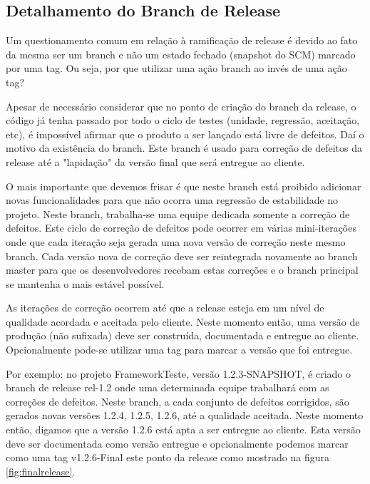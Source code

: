 \subsection{Detalhamento do Branch de Release}
\label{subsec:detalherelease}
Um questionamento comum em rela{\c c}{\~a}o à ramifica{\c c}{\~a}o de release {\'e} devido ao fato da mesma ser um branch e n{\~a}o um estado fechado (snapshot do SCM) marcado por uma tag. Ou seja, por que utilizar uma a{\c c}{\~a}o branch ao inv{\'e}s de uma a{\c c}{\~a}o tag?

Apesar de necess{\'a}rio considerar que no ponto de cria{\c c}{\~a}o do branch da release, o c{\'o}digo j{\'a} tenha passado por todo o ciclo de testes (unidade, regress{\~a}o, aceita{\c c}{\~a}o, etc), {\'e} imposs{\'i}vel afirmar que o produto a ser lan{\c c}ado est{\'a} livre de defeitos. Da{\'i} o motivo da exist{\^e}ncia do branch. Este branch {\'e} usado para corre{\c c}{\~a}o de defeitos da release at{\'e} a "lapida{\c c}{\~a}o" da vers{\~a}o final que ser{\'a} entregue ao cliente. 

O mais importante que devemos frisar {\'e} que neste branch est{\'a} proibido adicionar novas funcionalidades para que n{\~a}o ocorra uma regress{\~a}o de estabilidade no projeto. Neste branch, trabalha-se uma equipe dedicada somente a corre{\c c}{\~a}o de defeitos. Este ciclo de corre{\c c}{\~a}o de defeitos pode ocorrer em v{\'a}rias mini-itera{\c c}ões onde que cada itera{\c c}{\~a}o seja gerada uma nova vers{\~a}o de corre{\c c}{\~a}o neste mesmo branch. Cada vers{\~a}o nova de corre{\c c}{\~a}o deve ser reintegrada novamente ao branch master para que os desenvolvedores  recebam estas corre{\c c}ões e o branch principal se mantenha o mais est{\'a}vel poss{\'i}vel. 

As itera{\c c}ões de corre{\c c}{\~a}o ocorrem at{\'e} que a release esteja em um n{\'i}vel de qualidade acordada e aceitada pelo cliente. Neste momento ent{\~a}o, uma vers{\~a}o de produ{\c c}{\~a}o (n{\~a}o sufixada) deve ser constru{\'i}da, documentada e entregue ao cliente. Opcionalmente pode-se utilizar uma tag para marcar a vers{\~a}o que foi entregue. 

Por exemplo: no projeto FrameworkTeste, vers{\~a}o 1.2.3-SNAPSHOT, {\'e} criado o branch de release rel-1.2 onde uma determinada equipe trabalhar{\'a} com as corre{\c c}ões de defeitos. Neste branch, a cada conjunto de defeitos corrigidos, s{\~a}o gerados novas versões 1.2.4, 1.2.5, 1.2.6, at{\'e} a qualidade aceitada. Neste momento ent{\~a}o, digamos que a vers{\~a}o 1.2.6 est{\'a} apta a ser entregue ao cliente. Esta vers{\~a}o deve ser documentada como vers{\~a}o entregue e opcionalmente podemos marcar como uma tag v1.2.6-Final este ponto da release como mostrado na figura \ref{fig:finalrelease}.

